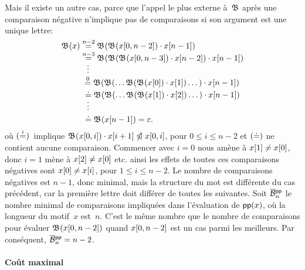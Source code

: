 Mais il existe un autre cas, parce que l'appel le plus externe
à~\(\mathfrak{B}\) après une comparaison négative n'implique pas de
comparaisons si son argument est une unique lettre:
\begin{align*}
\abovedisplayskip=0pt
\belowdisplayskip=0pt
\Border{}{x}
&\eqn{n-2} \Border{}{\Border{}{\ind{x}{0,n-2}} \cdot \ind{x}{n-1}}\\
&\eqn{n-3} \Border{}{\Border{}{\Border{}{\ind{x}{0,n-3}} \cdot
    \ind{x}{n-2}} \cdot \ind{x}{n-1}}\\
&\;\;\;\smash{\vdots}\\
&\;\mathrel{\stackrel{\smash[t]{0}}{=}}
  \Border{}{\Border{}{\ldots \Border{}{\Border{}{\ind{x}{0}} \cdot
        \ind{x}{1}} \dots} \cdot \ind{x}{n-1}}\\
&\,\,\doteq
  \Border{}{\Border{}{\ldots \Border{}{\Border{}{\ind{x}{1}} \cdot
            \ind{x}{2}} \dots} \cdot \ind{x}{n-1}}\\
&\;\;\;\smash{\vdots}\\
&\,\,\doteq \Border{}{\ind{x}{n-1}} = \varepsilon.
\end{align*}
où \((\smash{\mathrel{\stackrel{\smash{i}}{=}}})\)~implique \(\mathfrak{B}^{}({x}[{0,i}]) \cdot
{x}[{i+1}] \mathrel{\ntrianglelefteqslant} {x}[{0,i}]\), pour \(0 \leqslant i \leqslant
n-2\) et \((\smash{\doteq})\) ne contient aucune
comparaison. Commencer avec \(i=0\) nous amène à \({x}[{1}] \neq
{x}[{0}]\), donc \(i=1\) mène à \({x}[{2}] \neq {x}[{0}]\)
etc. ainsi les effets de toutes ces comparaisons négatives sont
\({x}[{0}] \neq {x}[{i}]\), pour \(1 \leqslant i \leqslant
n-2\). Le nombre de comparaisons négatives est \(n-1\), donc minimal,
mais la structure du mot est différente du cas précédent, car la
première lettre doit différer de toutes les suivantes. Soit
\(\OB{\fun{pp}}{n}\) le nombre minimal de
comparaisons impliquées dans l'évaluation de
\(\textsf{pp}(x)\), où la longueur du motif~\(x\)
est~\(n\). C'est le même nombre que le nombre de comparaisons pour
évaluer \(\mathfrak{B}^{}({x}[{0,n-2}])\) quand \({x}[{0,n-2}]\) est un
cas parmi les meilleurs. Par conséquent,
\(\OB{\fun{pp}}{n} = n - 2\).

\paragraph{Coût maximal}

